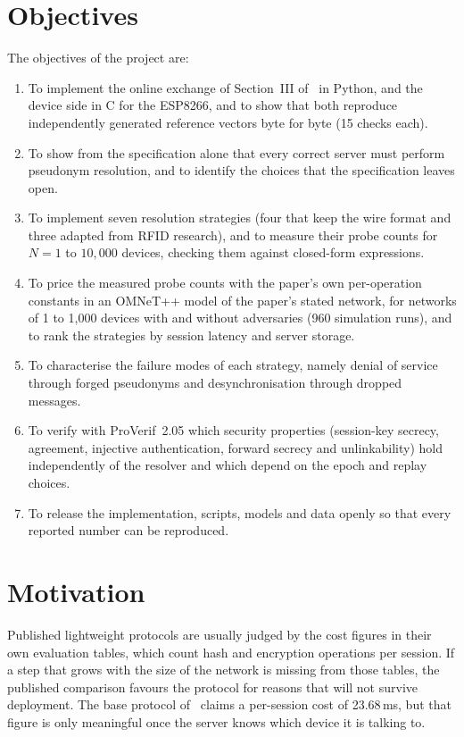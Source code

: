 \section{Objectives}
The objectives of the project are:
\begin{enumerate}
\item To implement the online exchange of Section~III of~\cite{base} in Python, and the device side in C for the ESP8266, and to show that both reproduce independently generated reference vectors byte for byte (15 checks each).
\item To show from the specification alone that every correct server must perform pseudonym resolution, and to identify the choices that the specification leaves open.
\item To implement seven resolution strategies (four that keep the wire format and three adapted from RFID research), and to measure their probe counts for $N=1$ to $10{,}000$ devices, checking them against closed-form expressions.
\item To price the measured probe counts with the paper's own per-operation constants in an OMNeT++ model of the paper's stated network, for networks of 1 to 1,000 devices with and without adversaries (960 simulation runs), and to rank the strategies by session latency and server storage.
\item To characterise the failure modes of each strategy, namely denial of service through forged pseudonyms and desynchronisation through dropped messages.
\item To verify with ProVerif~2.05 which security properties (session-key secrecy, agreement, injective authentication, forward secrecy and unlinkability) hold independently of the resolver and which depend on the epoch and replay choices.
\item To release the implementation, scripts, models and data openly so that every reported number can be reproduced.
\end{enumerate}

\section{Motivation}
Published lightweight protocols are usually judged by the cost figures in their own evaluation tables, which count hash and encryption operations per session. If a step that grows with the size of the network is missing from those tables, the published comparison favours the protocol for reasons that will not survive deployment. The base protocol of~\cite{base} claims a per-session cost of 23.68\,ms, but that figure is only meaningful once the server knows which device it is talking to.

